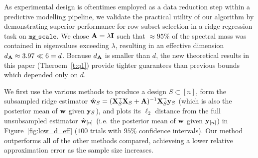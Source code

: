 As experimental design is oftentimes employed as a data reduction step within a
predictive modelling pipeline, we validate the practical utility of our
algorithm by demonstrating superior performance for row subset selection in a
ridge regression task on $\texttt{mg\_scale}$.
We chose $\mathbf A = \lambda \mathbf I$ such that $\approx 95\%$ of the spectral mass was
contained in eigenvalues exceeding $\lambda$, resulting in an effective
dimension $d_\mathbf A \approx 3.97 \ll 6 = d$.  Because $d_\mathbf A$ is smaller than $d$,
the new theoretical results in this paper (Theroem~\ref{t:q1}) provide tighter
guarantees than previous bounds which depended only on $d$.

We first use the various methods to produce a design $S \subset [n]$,
form the subsampled ridge estimator $\hat{\w}_S = (\X_S^\top \X_S + \A)^{-1}
\X_S^\top \y_S$ (which is also the posterior mean of $\mathbf w$ given $\mathbf y_S$),
and plots its $\ell_2$ distance from the full unsubsampled
estimator $\hat{\mathbf w}_{[n]}$ (i.e. the posterior mean of $\mathbf w$ given $\mathbf y_{[n]}$)
in Figure~\ref{fig:low_d_eff} ($100$ trials with $95\%$ confidence intervals).
Our method outperforms all of the other methods compared, achieveing a lower
relative approximation error as the sample size increases.
